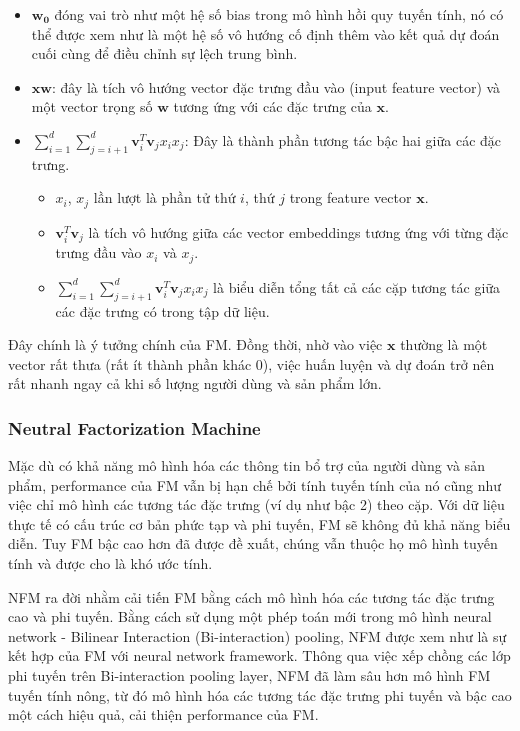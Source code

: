 \begin{itemize}
    \item $\mathbf{w_0}$ đóng vai trò như một hệ số bias trong mô hình hồi quy tuyến tính,
    nó có thể được xem như là một hệ số vô hướng cố định thêm vào kết quả dự đoán cuối cùng để điều chỉnh sự lệch trung bình.
    \item $\mathbf{xw}$: đây là tích vô hướng vector đặc trưng đầu vào (input feature vector)
    và một vector trọng số $\mathbf{w}$ tương ứng với các đặc trưng của $\mathbf{x}$.
    \item $\sum_{i=1}^{d}\sum_{j=i+1}^{d} \mathbf{v}_i^T\mathbf{v}_jx_ix_j$: Đây là thành phần tương tác bậc hai giữa các đặc trưng.
    \begin{itemize}
        \item $x_i$, $x_j$ lần lượt là phần tử thứ $i$, thứ $j$ trong feature vector $\mathbf{x}$.
        \item $\mathbf{v}_i^T\mathbf{v}_j$ là tích vô hướng giữa các vector embeddings tương ứng với từng đặc trưng đầu vào $x_i$ và $x_j$.
        \item $\sum_{i=1}^{d}\sum_{j=i+1}^{d} \mathbf{v}_i^T\mathbf{v}_jx_ix_j$ là biểu diễn tổng tất cả các cặp tương tác giữa các đặc trưng có trong tập dữ liệu.
    \end{itemize}
\end{itemize}

Đây chính là ý tưởng chính của FM. Đồng thời, nhờ vào việc $\mathbf{x}$ thường là một vector rất thưa (rất ít thành phần khác 0),
việc huấn luyện và dự đoán trở nên rất nhanh ngay cả khi số lượng người dùng và sản phẩm lớn.

\subsubsection{Neutral Factorization Machine}
Mặc dù có khả năng mô hình hóa các thông tin bổ trợ của người dùng và sản phẩm, performance của FM vẫn bị hạn chế
bởi tính tuyến tính của nó cũng như việc chỉ mô hình các tương tác đặc trưng (ví dụ như bậc 2) theo cặp.
Với dữ liệu thực tế có cấu trúc cơ bản phức tạp và phi tuyến, FM sẽ không đủ khả năng biểu diễn.
Tuy FM bậc cao hơn đã được đề xuất, chúng vẫn thuộc họ mô hình tuyến tính và được cho là khó ước tính.

\indent NFM ra đời nhằm cải tiến FM bằng cách mô hình hóa các tương tác đặc trưng cao và phi tuyến.
Bằng cách sử dụng một phép toán mới trong mô hình neural network - Bilinear Interaction (Bi-interaction) pooling,
NFM được xem như là sự kết hợp của FM với neural network framework. Thông qua việc xếp chồng các lớp phi tuyến trên Bi-interaction pooling layer,
NFM đã làm sâu hơn mô hình FM tuyến tính nông, từ đó mô hình hóa các tương tác đặc trưng phi tuyến và bậc cao một cách hiệu quả, cải thiện performance của FM.

